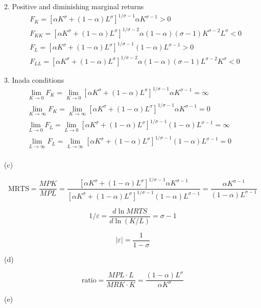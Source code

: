 \documentclass[letterpaper, 11pt]{article}
\newcommand{\1}{\mathds{1}}	%
\theoremstyle{definition}
\begin{document}
2. Positive and diminishing marginal returns \begin{align*}
   & F_K = \left[ \alpha K^{\sigma}  + (1-\alpha)L ^{\sigma}\right]^{1/\sigma - 1}\alpha K^{\sigma - 1}  > 0                   \\
   & F_{KK} = [\alpha K^\sigma + (1-\alpha)L^\sigma]^{1/\sigma - 2} \alpha(1-\alpha)(\sigma - 1) K^{\sigma - 2}L^{\sigma} < 0  \\
   & F_L = \left[ \alpha K^{\sigma}  + (1-\alpha)L ^{\sigma}\right]^{1/\sigma - 1}(1- \alpha )L^{\sigma - 1}  > 0              \\
   & F_{LL} = [\alpha K^\sigma + (1-\alpha)L^\sigma]^{1/\sigma - 2} \alpha(1-\alpha)(\sigma - 1) L^{\sigma - 2} K^{\sigma} < 0
\end{align*}

3. Inada conditions \begin{align*} %
   & \lim_{K \to 0}F_K = \lim_{K \to 0} \left[ \alpha K^{\sigma}  + (1-\alpha)L ^{\sigma}\right]^{1/\sigma - 1}\alpha K^{\sigma - 1} = \infty              \\
   & \lim_{K \to \infty} F_K = \lim_{K \to \infty} \left[ \alpha K^{\sigma}  + (1-\alpha)L ^{\sigma}\right]^{1/\sigma - 1}\alpha K^{\sigma - 1} = 0        \\
   & \lim_{L \to 0}F_L = \lim_{L \to 0}  \left[ \alpha K^{\sigma}  + (1-\alpha)L ^{\sigma}\right]^{1/\sigma - 1}(1- \alpha )L^{\sigma - 1} = \infty \qquad \\
   & \lim_{L \to \infty} F_L = \lim_{L \to \infty} \left[ \alpha K^{\sigma}  + (1-\alpha)L ^{\sigma}\right]^{1/\sigma - 1}(1- \alpha )L^{\sigma - 1} = 0   \\
\end{align*}

(c)

\[
  \text{MRTS} = \frac{MPK}{MPL} = \frac{\left[ \alpha K^{\sigma}  + (1-\alpha)L ^{\sigma}\right]^{1/\sigma - 1}\alpha K^{\sigma - 1}}{\left[ \alpha K^{\sigma}  + (1-\alpha)L ^{\sigma}\right]^{1/\sigma - 1}(1- \alpha )L^{\sigma - 1}} = \frac{\alpha K^{\sigma -1}}{(1-\alpha)L^{\sigma - 1}}
\]

\[
  1/\varepsilon = \frac{d\ln MRTS}{d\ln (K/L)} = \sigma - 1
\]

\[
  \left| \varepsilon \right|  = \frac{1}{1-\sigma}
\]

(d)

\[
  \text{ratio} = \frac{MPL \cdot L}{MRK \cdot  K} = \frac{(1-\alpha )L^{\sigma}}{\alpha K^{\sigma}}
\]

(e)
\end{document}

